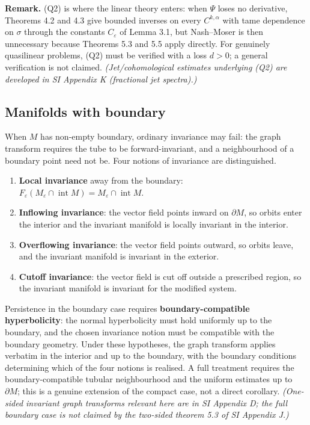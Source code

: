 \documentclass[11pt,a4paper]{article}
\theoremstyle{plain}
\theoremstyle{definition}
\theoremstyle{remark}
\numberwithin{equation}{section}
\numberwithin{figure}{section}
\begin{document}
\textbf{Remark.} (Q2) is where the linear theory enters: when $\Psi$ loses no derivative, Theorems 4.2 and 4.3 give bounded inverses on every $C^{k,\alpha}$ with tame dependence on $\sigma$ through the constants $C_{\varepsilon}$ of Lemma 3.1, but Nash–Moser is then unnecessary because Theorems 5.3 and 5.5 apply directly. For genuinely quasilinear problems, (Q2) must be verified with a loss $d>0$; a general verification is not claimed. \textit{(Jet/cohomological estimates underlying (Q2) are developed in SI Appendix K (fractional jet spectra).)}

\subsection{Manifolds with boundary}

When \(M\) has non-empty boundary, ordinary invariance may fail: the graph transform requires the tube to be forward-invariant, and a neighbourhood of a boundary point need not be. Four notions of invariance are distinguished.

\begin{enumerate}
    \item \textbf{Local invariance} away from the boundary: \(F_\varepsilon(M_\varepsilon\cap\operatorname{int}M)=M_\varepsilon\cap\operatorname{int}M\).
    \item \textbf{Inflowing invariance}: the vector field points inward on \(\partial M\), so orbits enter the interior and the invariant manifold is locally invariant in the interior.
    \item \textbf{Overflowing invariance}: the vector field points outward, so orbits leave, and the invariant manifold is invariant in the exterior.
    \item \textbf{Cutoff invariance}: the vector field is cut off outside a prescribed region, so the invariant manifold is invariant for the modified system.
\end{enumerate}

Persistence in the boundary case requires \textbf{boundary-compatible hyperbolicity}: the normal hyperbolicity must hold uniformly up to the boundary, and the chosen invariance notion must be compatible with the boundary geometry. Under these hypotheses, the graph transform applies verbatim in the interior and up to the boundary, with the boundary conditions determining which of the four notions is realised. A full treatment requires the boundary-compatible tubular neighbourhood and the uniform estimates up to \(\partial M\); this is a genuine extension of the compact case, not a direct corollary. \textit{(One-sided invariant graph transforms relevant here are in SI Appendix D; the full boundary case is not claimed by the two-sided theorem 5.3 of SI Appendix J.)}
\end{document}
